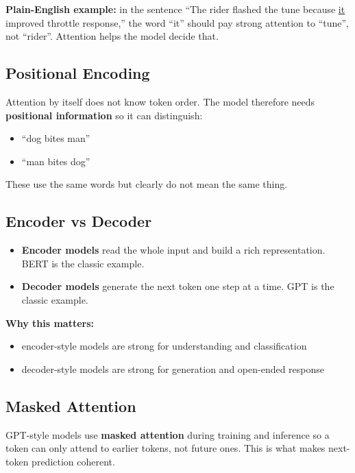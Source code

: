 \documentclass[12pt, a4paper, oneside]{book}
\begin{document}
\textbf{Plain-English example:} in the sentence ``The rider flashed the tune because \underline{it} improved throttle response,'' the word ``it'' should pay strong attention to ``tune'', not ``rider''. Attention helps the model decide that.

\subsection{Positional Encoding}

Attention by itself does not know token order. The model therefore needs \textbf{positional information} so it can distinguish:
\begin{itemize}[leftmargin=2em]
    \item ``dog bites man''
    \item ``man bites dog''
\end{itemize}

These use the same words but clearly do not mean the same thing.

\subsection{Encoder vs Decoder}

\begin{itemize}[leftmargin=2em]
    \item \textbf{Encoder models} read the whole input and build a rich representation. BERT is the classic example.
    \item \textbf{Decoder models} generate the next token one step at a time. GPT is the classic example.
\end{itemize}

\textbf{Why this matters:}
\begin{itemize}[leftmargin=2em]
    \item encoder-style models are strong for understanding and classification
    \item decoder-style models are strong for generation and open-ended response
\end{itemize}

\subsection{Masked Attention}

GPT-style models use \textbf{masked attention} during training and inference so a token can only attend to earlier tokens, not future ones. This is what makes next-token prediction coherent.
\end{document}
